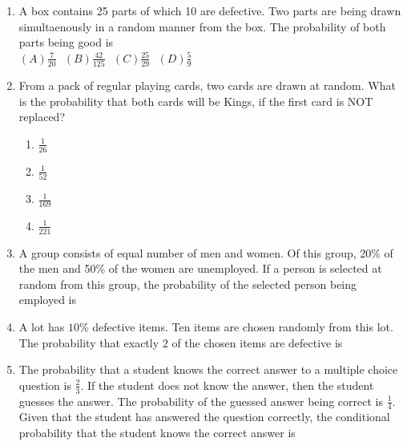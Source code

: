 \documentclass[journal,12pt,twocolumn]{IEEEtran}
\begin{document}
\begin{enumerate}
%
\solution

%
\item A box contains 25 parts of which 10 are defective. Two parts are being drawn simultaenously in a random manner from the box. The probability of both parts being good is\\
$(A)\frac{7}{20}\ \ \ (B)\frac{42}{125}\ \ \ (C)\frac{25}{29}\ \ \ (D)\frac{5}{9}$
%
\solution

%
\item From a pack of regular playing cards, two cards are drawn at random. What is
the probability that both cards will be Kings, if the first card is NOT replaced?
    \begin{enumerate}
    \item $\frac{1}{26}$
    \item $\frac{1}{52}$
    \item $\frac{1}{169}$
    \item $\frac{1}{221}$
\end{enumerate}
%
\solution

%
\item A group consists of equal number of men and women. Of this group, 20\% of the men and 50\% of the women are unemployed. If a person is selected at random from this group, the probability of the selected person being employed is  
%
\solution

%
\item  A lot has $10\%$ defective items. Ten items are chosen randomly from this lot. The probability that exactly $2$ of the chosen items are defective is
%
\solution

%
\item The probability that a student knows the correct answer to a multiple choice question is $\frac{2}{3}$. If the student does not know the answer, then the student guesses the answer. The probability of the guessed answer being correct is $\frac{1}{4}$. Given that the student has answered the question correctly, the conditional probability that the student knows the correct answer is


\end{enumerate}
\end{document}
